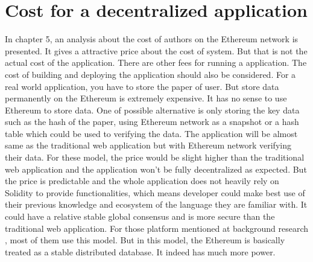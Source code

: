 \documentclass[openany,12pt]{ecsthesis}      %
\begin{document}
\section{Cost for a decentralized application}
In chapter 5, an analysis about the cost of authors on the Ethereum network is presented. 
It gives a attractive price about the cost of system. 
But that is not the actual cost of the application. There are other fees for running a application.
The cost of building and deploying the application should also be considered. 
For a real world application, you have to store the paper of user. 
But store data permanently on the Ethereum is extremely expensive. 
It has no sense to use Ethereum to store data.
One of possible alternative is only storing the key data such as the hash of the paper, 
using Ethereum network as a snapshot or a hash table which could be used to verifying the data.
The application will be almost same as the traditional web application but with Ethereum network verifying their data.
For these model, 
the price would be slight higher than the traditional web application and 
the application won't be fully decentralized as expected. But the price is predictable and  
the whole application does not heavily rely on Solidity to provide functionalities, 
which means developer could make best use of their previous knowledge and ecosystem of the language they are familiar with.
It could have a relative stable global consensus and is more secure than the traditional web application.
For those platform mentioned at background research \cite{DEIP} \cite{Pluto}, most of them use this model.
But in this model, the Ethereum is basically treated as a stable distributed database. It indeed has much more power. 
\end{document}
